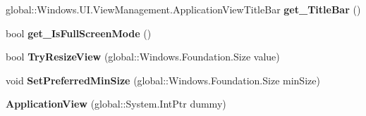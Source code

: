 \begin{DoxyCompactItemize}
global\+::\+Windows.\+U\+I.\+View\+Management.\+Application\+View\+Title\+Bar {\bfseries get\+\_\+\+Title\+Bar} ()
\item 
\mbox{\label{class_windows_1_1_u_i_1_1_view_management_1_1_application_view_afde1936ca2f8aded16b77720619151e5}} 
bool {\bfseries get\+\_\+\+Is\+Full\+Screen\+Mode} ()
\item 
\mbox{\label{class_windows_1_1_u_i_1_1_view_management_1_1_application_view_a239abe45572bb1478737b90836a4b386}} 
bool {\bfseries Try\+Resize\+View} (global\+::\+Windows.\+Foundation.\+Size value)
\item 
\mbox{\label{class_windows_1_1_u_i_1_1_view_management_1_1_application_view_a0578db6c17fe182700dc8c5cb8973a14}} 
void {\bfseries Set\+Preferred\+Min\+Size} (global\+::\+Windows.\+Foundation.\+Size min\+Size)
\item 
\mbox{\label{class_windows_1_1_u_i_1_1_view_management_1_1_application_view_a10e1e2089e594fe33f2e591fc465535c}} 
{\bfseries Application\+View} (global\+::\+System.\+Int\+Ptr dummy)
\end{DoxyCompactItemize}
